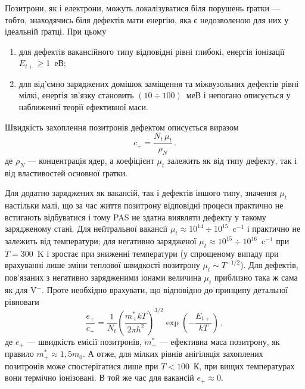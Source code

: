 Позитрони, як і електрони, можуть локалізуватися біля порушень ґратки --- тобто, знаходячись біля дефектів мати енергію,
яка є недозволеною для них у ідеальній ґратці.
При цьому
\begin{enumerate}[label=\asbuk*),leftmargin=0em,itemindent=1.5em]
\item для дефектів вакансійного типу відповідні рівні глибокі, енергія іонізації $E_{t+}\geq$1~еВ;
\item для від'ємно заряджених домішок заміщення та міжвузольних дефектів рівні мілкі,
 енергія зв'язку становить $(10\div100)$~меВ і
непогано описується у наближенні теорії ефективної маси.
\end{enumerate}

Швидкість захоплення позитронів дефектом описується виразом
\begin{equation}\label{PASc}
c_+=\frac{N_t\,\mu_t}{\rho_N}\,.
\end{equation}
де
$\rho_N$ --- концентрація ядер,
а коефіцієнт $\mu_t$ залежить як від типу дефекту, так і від властивостей основної ґратки.

Для додатно заряджених як вакансій, так і дефектів іншого типу, значення $\mu_t$
настільки малі, що за час життя позитрону відповідні процеси практично не встигають відбуватися і тому
PAS не здатна виявляти дефекту у такому зарядженому стані.
Для нейтральної вакансії $\mu_t\approx10^{14}\div10^{15}$~c$^{-1}$ і практично не залежить від температури;
для негативно зарядженої $\mu_t\approx10^{15}\div10^{16}$~c$^{-1}$ при $T=300$~K і зростає при
зниженні температури (у спрощеному випаду при врахуванні лише зміни теплової швидкості
позитрону $\mu_t\sim T^{-1/2}$).
Для дефектів, пов'язаних з негативно зарядженими іонами величина $\mu_t$ приблизно така ж сама
як для V$^-$.
Проте необхідно врахувати, що відповідно до принципу детальної рівноваги
\begin{equation}\label{PASce}
\frac{e_+}{c_+}=\frac{1}{N_t}\left(\frac{m_+^*kT}{2\pi\hbar^2}\right)^{3/2}\exp\left(-\frac{E_{t+}}{kT}\right)\,,
\end{equation}
де
$e_+$ --- швидкість емісії позитронів,
$m_+^*$ --- ефективна маса позитрону, як правило $m_+^*\approx1,5 m_0$.
А отже, для мілких рівнів анігіляція захоплених позитронів може спостерігатися лише при
$T<100$~К, при вищих температурах вони термічно іонізовані.
В той же час для вакансій $e_+\approx0$.

